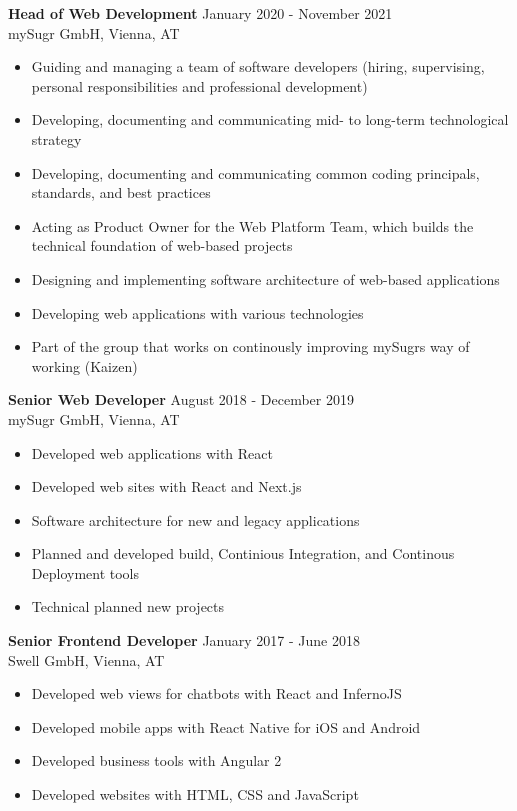 \documentclass[margin]{res}
\begin{document}
\begin{resume}
\textbf{Head of Web Development} \hfill January 2020 - November 2021 \\
  mySugr GmbH, Vienna, AT
  \begin{itemize}
    \item Guiding and managing a team of software developers (hiring, supervising, personal responsibilities and professional development)
    \item Developing, documenting and communicating mid- to long-term technological strategy
    \item Developing, documenting and communicating common coding principals, standards, and best practices
    \item Acting as Product Owner for the Web Platform Team, which builds the technical foundation of web-based projects
    \item Designing and implementing software architecture of web-based applications
    \item Developing web applications with various technologies
    \item Part of the group that works on continously improving mySugrs way of working (Kaizen)
  \end{itemize}

\textbf{Senior Web Developer} \hfill August 2018 - December 2019 \\
  mySugr GmbH, Vienna, AT
  \begin{itemize}
    \item Developed web applications with React
    \item Developed web sites with React and Next.js
    \item Software architecture for new and legacy applications
    \item Planned and developed build, Continious Integration, and Continous Deployment tools
    \item Technical planned new projects
  \end{itemize}

\textbf{Senior Frontend Developer} \hfill January 2017 - June 2018 \\
  Swell GmbH, Vienna, AT
  \begin{itemize}
    \item Developed web views for chatbots with React and InfernoJS
    \item Developed mobile apps with React Native for iOS and Android
    \item Developed business tools with Angular 2
    \item Developed websites with HTML, CSS and JavaScript
  \end{itemize}


\end{resume}
\end{document}
